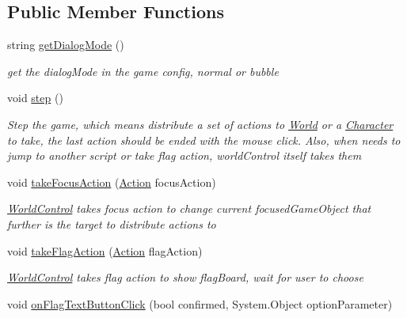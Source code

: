 \subsection*{Public Member Functions}
\begin{DoxyCompactItemize}
\item 
string \hyperlink{classdoki_unity_1_1_world_control_a473fbf334f1dd96f5fa0fbbe0a5000bf}{get\+Dialog\+Mode} ()
\begin{DoxyCompactList}\small\item\em get the dialog\+Mode in the game config, normal or bubble \end{DoxyCompactList}\item 
void \hyperlink{classdoki_unity_1_1_world_control_a21f4d4bda7ad397ad92f9970c9c83e33}{step} ()
\begin{DoxyCompactList}\small\item\em Step the game, which means distribute a set of actions to \hyperlink{classdoki_unity_1_1_world}{World} or a \hyperlink{classdoki_unity_1_1_character}{Character} to take, the last action should be ended with the mouse click. Also, when needs to jump to another script or take flag action, world\+Control itself takes them \end{DoxyCompactList}\item 
void \hyperlink{classdoki_unity_1_1_world_control_ac847f05a3a50573d1777ca056869f536}{take\+Focus\+Action} (\hyperlink{classdoki_script_setting_1_1_action}{Action} focus\+Action)
\begin{DoxyCompactList}\small\item\em \hyperlink{classdoki_unity_1_1_world_control}{World\+Control} takes focus action to change current focused\+Game\+Object that further is the target to distribute actions to \end{DoxyCompactList}\item 
void \hyperlink{classdoki_unity_1_1_world_control_a8bd0eb2bb67bb25fd2ecf1f83ef272dd}{take\+Flag\+Action} (\hyperlink{classdoki_script_setting_1_1_action}{Action} flag\+Action)
\begin{DoxyCompactList}\small\item\em \hyperlink{classdoki_unity_1_1_world_control}{World\+Control} takes flag action to show flag\+Board, wait for user to choose \end{DoxyCompactList}\item 
void \hyperlink{classdoki_unity_1_1_world_control_a89c510beb7ed4d5b4562b8c6acc92caf}{on\+Flag\+Text\+Button\+Click} (bool confirmed, System.\+Object option\+Parameter)

\end{DoxyCompactItemize}
